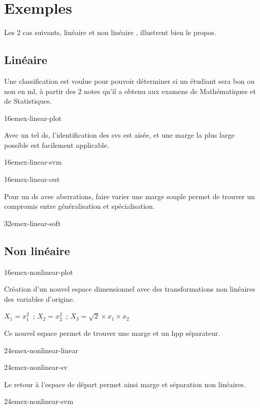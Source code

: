 \section{Exemples}

Les 2 cas suivants,
linéaire \cite{ex-linear} et non linéaire \cite{ex-nonlinear},
illustrent bien le propos.

\subsection{Linéaire}

Une classification est voulue pour pouvoir déterminer si un étudiant
sera bon ou non en \gls{ml}, à partir des 2 notes qu’il a obtenu
aux examens de Mathématiques et de Statistiques.

{16em}{ex-linear-plot}

Avec un tel \gls{ds}, l’identification des \glspl{sv} est aisée,
et une marge la plus large possible est facilement applicable.

{16em}{ex-linear-svm}

\pagebreak

{16em}{ex-linear-out}

Pour un \gls{ds} avec aberrations, faire varier une marge souple permet
de trouver un compromis entre généralisation et spécialisation.

{32em}{ex-linear-soft}

\pagebreak

\subsection{Non linéaire}

{16em}{ex-nonlinear-plot}

Création d’un nouvel espace dimensionnel avec des transformations
non linéaires des variables d’origine.

{\large
$X_{1}=x_{1}^{2}$ ; $X_{2}=x_{2}^{2}$ ; $X_{3}=\sqrt{2} × x_{1} × x_{2}$
}

Ce nouvel espace permet de trouver une marge et un \gls{hpp} séparateur.

{24em}{ex-nonlinear-linear}

\pagebreak

{24em}{ex-nonlinear-sv}

Le retour à l’espace de départ permet ainsi marge et séparation non linéaires.

{24em}{ex-nonlinear-svm}

\pagebreak
